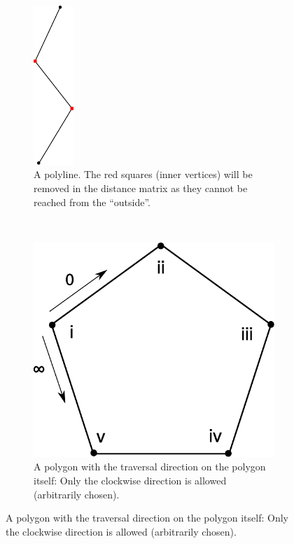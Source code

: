 \begin{figure}
\centering
\begin{subfigure}[b]{0.45\textwidth}
\centering
\includegraphics[height=6cm]{images/path_planning/tsp_polyline.pdf}
\caption{A polyline. The red squares (inner vertices) will be removed in the distance matrix as they cannot be reached from the \enquote{outside}.}
\end{subfigure}
~
\begin{subfigure}[b]{0.45\textwidth}
\includegraphics[width=1\textwidth]{images/path_planning/tsp_polygon.pdf}
\caption{A polygon with the traversal direction on the polygon itself: Only the clockwise direction is allowed (arbitrarily chosen).}
\end{subfigure}

\par\bigskip


\end{figure}
